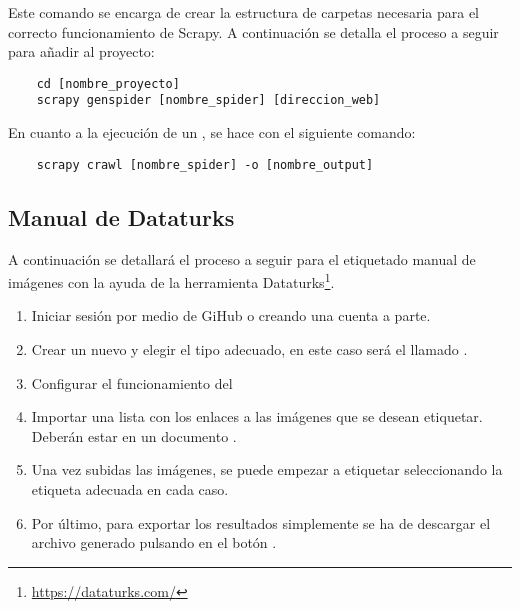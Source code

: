 Este comando se encarga de crear la estructura de carpetas necesaria para el correcto funcionamiento de Scrapy. A continuación se detalla el proceso a seguir para añadir  al proyecto:

\begin{verbatim}
    cd [nombre_proyecto]
    scrapy genspider [nombre_spider] [direccion_web]
\end{verbatim}

En cuanto a la ejecución de un , se hace con el siguiente comando:

\begin{verbatim}
    scrapy crawl [nombre_spider] -o [nombre_output]
\end{verbatim}

\subsection{Manual de Dataturks}

A continuación se detallará el proceso a seguir para el etiquetado manual de imágenes con la ayuda de la herramienta Dataturks\footnote{\url{https://dataturks.com/}}.

\begin{enumerate}
    \item Iniciar sesión por medio de GiHub o creando una cuenta a parte.
    \item Crear un nuevo  y elegir el tipo adecuado, en este caso será el llamado .
    
    
    \item Configurar el funcionamiento del 
    
    
    \item Importar una lista con los enlaces a las imágenes que se desean etiquetar. Deberán estar en un documento .
    
    \item Una vez subidas las imágenes, se puede empezar a etiquetar seleccionando la etiqueta adecuada en cada caso.
    
    
    \item Por último, para exportar los resultados simplemente se ha de descargar el archivo generado pulsando en el botón .
    
\end{enumerate}

